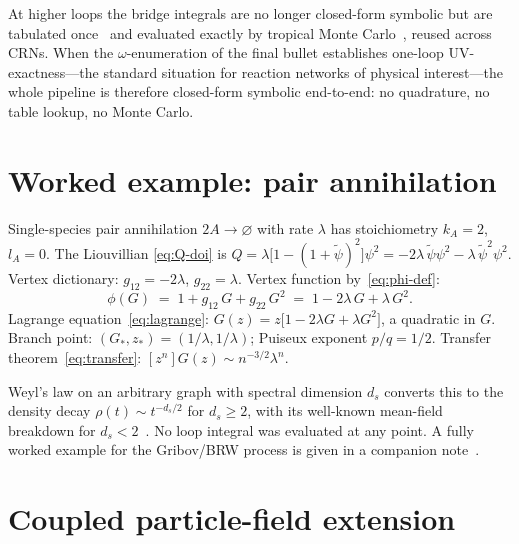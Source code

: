 \documentclass[11pt,a4paper]{article}
\newcommand{\psit}{\tilde\psi}
\theoremstyle{plain}
\theoremstyle{definition}
\begin{document}
At higher loops the bridge integrals are no longer closed-form
symbolic but are tabulated once~\citep{BognerWeinzierl}
and evaluated exactly by tropical Monte
Carlo~\citep{Borinsky2020,Borinsky2025}, reused across CRNs.  When
the $\omega$-enumeration of the final bullet establishes one-loop
UV-exactness---the standard situation for reaction networks of
physical interest---the whole pipeline is therefore closed-form
symbolic end-to-end: no quadrature, no table lookup, no Monte
Carlo.

\section{Worked example: pair annihilation}
\label{sec:example}

Single-species pair annihilation $2A \to \varnothing$ with rate
$\lambda$ has stoichiometry $k_A = 2$, $l_A = 0$.  The Liouvillian
\eqref{eq:Q-doi} is
$Q = \lambda\bigl[1 - (1+\psit)^2\bigr]\psi^2 =
-2\lambda\,\psit\psi^2 - \lambda\,\psit^2\psi^2$.
Vertex dictionary: $g_{12} = -2\lambda$, $g_{22} = \lambda$.
Vertex function by~\eqref{eq:phi-def}:
\begin{equation}
  \phi(G) \;=\; 1 + g_{12}\,G + g_{22}\,G^2
  \;=\; 1 - 2\lambda\,G + \lambda\,G^2.
\end{equation}
Lagrange equation~\eqref{eq:lagrange}:
$G(z) = z\bigl[1 - 2\lambda G + \lambda G^2\bigr]$, a quadratic
in $G$.  Branch point:
$(G_*, z_*) = (1/\lambda, 1/\lambda)$; Puiseux exponent
$p/q = 1/2$.  Transfer theorem~\eqref{eq:transfer}:
$[z^n]G(z) \sim n^{-3/2}\lambda^n$.

Weyl's law on an arbitrary graph with spectral dimension $d_s$
converts this to the density decay $\rho(t) \sim t^{-d_s/2}$ for
$d_s \geq 2$, with its well-known mean-field breakdown for
$d_s < 2$~\citep{Tauber}.  No loop integral was evaluated at any
point.  A fully worked example for the Gribov/BRW process is given
in a companion note~\citep{AmarteifioBRW}.

\section{Coupled particle-field extension}
\label{sec:multi}
\end{document}
